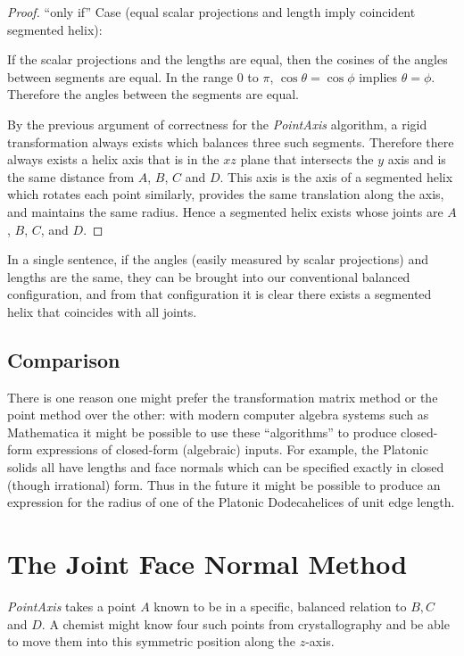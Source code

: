 \documentclass[11pt]{article}
\begin{document}
{\begin{proof}
  ``only if'' Case (equal scalar projections and length imply coincident segmented helix):

  If the scalar projections and the lengths are equal, then the cosines of the angles between segments are equal.
  In the range $0$ to $\pi$,
  $\cos{\theta} = \cos{\phi}$ implies $\theta = \phi$. Therefore the angles between the segments are equal.

  By the previous argument of correctness for the {\em PointAxis} algorithm, a rigid transformation always exists
  which balances three such segments. Therefore there always exists a helix axis that
  is in the $xz$ plane that intersects the $y$ axis and is the same distance from $A$, $B$, $C$ and $D$.
  This axis is the axis of a segmented helix which rotates each point similarly, provides the same translation along the axis,
  and maintains the same radius. Hence a segmented helix exists whose joints are $A$, $B$, $C$, and $D$.
\end{proof}

In a single sentence, if the angles (easily measured by scalar projections) and lengths are the same,
they can be brought into our conventional balanced configuration,
and from that configuration it is clear there exists a segmented helix that coincides with all joints.

\subsection{Comparison}

There is one reason one might prefer the transformation matrix method or the point method over the other: with modern
computer algebra systems such as Mathematica\cite{Mathematica} it might be possible to use these ``algorithms'' to produce closed-form
expressions of closed-form (algebraic) inputs. For example, the Platonic solids all have lengths and face normals which
can be specified exactly in closed (though irrational) form.
Thus in the future it might be possible to produce an expression for the
radius of one of the Platonic Dodecahelices of unit edge length.


\section{The Joint Face Normal Method}
\label{sec:facenormal}

{\em PointAxis} takes a point $A$ known to be in a specific, balanced relation
to $B, C$ and $D$. A chemist might know four such points from crystallography
and be able to move them into this symmetric position along the $z$-axis.

}
\end{document}
